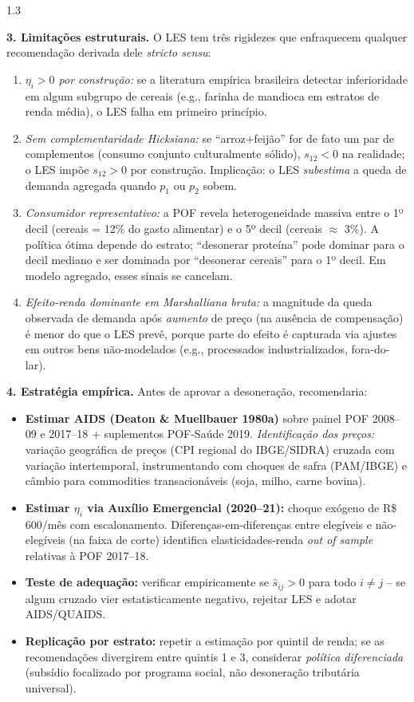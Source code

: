 \documentclass[11pt,addpoints]{exam}
\begin{document}
\begin{spacing}{1.3}
\begin{questions}
\begin{solution}
\textbf{3. Limitações estruturais.} O LES tem três rigidezes que enfraquecem qualquer recomendação derivada dele \emph{stricto sensu}:
\begin{enumerate}[noitemsep]
\item \emph{$\eta_i > 0$ por construção:} se a literatura empírica brasileira detectar inferioridade em algum subgrupo de cereais (e.g., farinha de mandioca em estratos de renda média), o LES falha em primeiro princípio.
\item \emph{Sem complementaridade Hicksiana:} se ``arroz+feijão'' for de fato um par de complementos (consumo conjunto culturalmente sólido), $s_{12} < 0$ na realidade; o LES impõe $s_{12} > 0$ por construção. Implicação: o LES \emph{subestima} a queda de demanda agregada quando $p_1$ ou $p_2$ sobem.
\item \emph{Consumidor representativo:} a POF revela heterogeneidade massiva entre o 1º decil (cereais = 12\% do gasto alimentar) e o 5º decil (cereais $\approx$ 3\%). A política ótima depende do estrato; ``desonerar proteína'' pode dominar para o decil mediano e ser dominada por ``desonerar cereais'' para o 1º decil. Em modelo agregado, esses sinais se cancelam.
\item \emph{Efeito-renda dominante em Marshalliana bruta:} a magnitude da queda observada de demanda após \emph{aumento} de preço (na ausência de compensação) é menor do que o LES prevê, porque parte do efeito é capturada via ajustes em outros bens não-modelados (e.g., processados industrializados, fora-do-lar).
\end{enumerate}

\textbf{4. Estratégia empírica.} Antes de aprovar a desoneração, recomendaria:
\begin{itemize}[noitemsep]
\item \textbf{Estimar AIDS (Deaton \& Muellbauer 1980a)} sobre painel POF 2008--09 e 2017--18 + suplementos POF-Saúde 2019. \emph{Identificação dos preços:} variação geográfica de preços (CPI regional do IBGE/SIDRA) cruzada com variação intertemporal, instrumentando com choques de safra (PAM/IBGE) e câmbio para commodities transacionáveis (soja, milho, carne bovina).
\item \textbf{Estimar $\eta_i$ via Auxílio Emergencial (2020--21):} choque exógeno de R\$ 600/mês com escalonamento. Diferenças-em-diferenças entre elegíveis e não-elegíveis (na faixa de corte) identifica elasticidades-renda \emph{out of sample} relativas à POF 2017--18.
\item \textbf{Teste de adequação:} verificar empiricamente se $\hat s_{ij} > 0$ para todo $i \neq j$ -- se algum cruzado vier estatisticamente negativo, rejeitar LES e adotar AIDS/QUAIDS.
\item \textbf{Replicação por estrato:} repetir a estimação por quintil de renda; se as recomendações divergirem entre quintis 1 e 3, considerar \emph{política diferenciada} (subsídio focalizado por programa social, não desoneração tributária universal).
\end{itemize}


\end{solution}
\end{questions}
\end{spacing}
\end{document}
